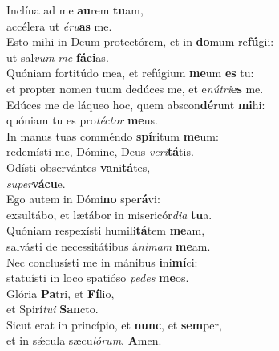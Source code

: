 \evenverse Inclína ad me \textbf{au}rem \textbf{tu}am,~\*\\
\evenverse accélera ut \textit{é}\textit{ru}\textbf{as} me.\\
\oddverse Esto mihi in Deum protectórem, et in \textbf{do}mum re\textbf{fú}gii:~\*\\
\oddverse ut sal\textit{vum} \textit{me} \textbf{fá}\textbf{ci}as.\\
\evenverse Quóniam fortitúdo mea, et refúgium \textbf{me}um \textbf{es} tu:~\*\\
\evenverse et propter nomen tuum dedúces me, et e\textit{nú}\textit{tri}\textbf{es} me.\\
\oddverse Edúces me de láqueo hoc, quem abscon\textbf{dé}runt \textbf{mi}hi:~\*\\
\oddverse quóniam tu es pro\textit{té}\textit{ctor} \textbf{me}us.\\
\evenverse In manus tuas comméndo \textbf{spí}ritum \textbf{me}um:~\*\\
\evenverse redemísti me, Dómine, Deus \textit{ve}\textit{ri}\textbf{tá}tis.\\
\oddverse Odísti observántes \textbf{va}ni\textbf{tá}tes,~\*\\
\oddverse \textit{su}\textit{per}\textbf{vá}\textbf{cu}e.\\
\evenverse Ego autem in Dómi\textbf{no} spe\textbf{rá}vi:~\*\\
\evenverse exsultábo, et lætábor in misericór\textit{di}\textit{a} \textbf{tu}a.\\
\oddverse Quóniam respexísti humili\textbf{tá}tem \textbf{me}am,~\*\\
\oddverse salvásti de necessitátibus á\textit{ni}\textit{mam} \textbf{me}am.\\
\evenverse Nec conclusísti me in mánibus \textbf{i}ni\textbf{mí}ci:~\*\\
\evenverse statuísti in loco spatióso \textit{pe}\textit{des} \textbf{me}os.\\
\oddverse Glória \textbf{Pa}tri, et \textbf{Fí}lio,~\*\\
\oddverse et Spirí\textit{tu}\textit{i} \textbf{San}cto.\\
\evenverse Sicut erat in princípio, et \textbf{nunc}, et \textbf{sem}per,~\*\\
\evenverse et in sǽcula sæcu\textit{ló}\textit{rum}. \textbf{A}men.\\
